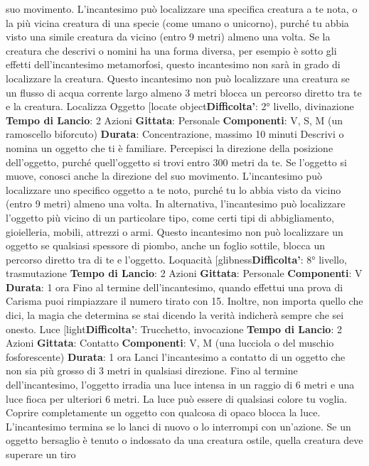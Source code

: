 \begin{multicols}{2}
suo movimento.
L’incantesimo può localizzare una specifica creatura a
te nota, o la più vicina creatura di una specie (come
umano o unicorno), purché tu abbia visto una simile
creatura da vicino (entro 9 metri) almeno una volta. Se
la creatura che descrivi o nomini ha una forma diversa,
per esempio è sotto gli effetti dell’incantesimo
metamorfosi, questo incantesimo non sarà in grado di
localizzare la creatura.
Questo incantesimo non può localizzare una creatura
se un flusso di acqua corrente largo almeno 3 metri
blocca un percorso diretto tra te e la creatura.
Localizza Oggetto
[locate object\textbf{Difficolta'}:
2° livello, divinazione
\textbf{Tempo di Lancio}: 2 Azioni
\textbf{Gittata}: Personale
\textbf{Componenti}: V, S, M (un ramoscello biforcuto)
\textbf{Durata}: Concentrazione, massimo 10 minuti
Descrivi o nomina un oggetto che ti è familiare.
Percepisci la direzione della posizione dell’oggetto,
purché quell’oggetto si trovi entro 300 metri da te. Se
l’oggetto si muove, conosci anche la direzione del suo
movimento.
L’incantesimo può localizzare uno specifico oggetto a te
noto, purché tu lo abbia visto da vicino (entro 9 metri)
almeno una volta. In alternativa, l’incantesimo può
localizzare l’oggetto più vicino di un particolare tipo,
come certi tipi di abbigliamento, gioielleria, mobili,
attrezzi o armi.
Questo incantesimo non può localizzare un oggetto se
qualsiasi spessore di piombo, anche un foglio sottile,
blocca un percorso diretto tra di te e l’oggetto.
Loquacità
[glibness\textbf{Difficolta'}:
8° livello, trasmutazione
\textbf{Tempo di Lancio}: 2 Azioni
\textbf{Gittata}: Personale
\textbf{Componenti}: V
\textbf{Durata}: 1 ora
Fino al termine dell’incantesimo, quando effettui una
prova di Carisma puoi rimpiazzare il numero tirato con
15. Inoltre, non importa quello che dici, la magia che
determina se stai dicendo la verità indicherà sempre
che sei onesto.
Luce
[light\textbf{Difficolta'}:
Trucchetto, invocazione
\textbf{Tempo di Lancio}: 2 Azioni
\textbf{Gittata}: Contatto
\textbf{Componenti}: V, M (una lucciola o del muschio
fosforescente)
\textbf{Durata}: 1 ora
Lanci l’incantesimo a contatto di un oggetto che non sia
più grosso di 3 metri in qualsiasi direzione. Fino al
termine dell’incantesimo, l’oggetto irradia una luce
intensa in un raggio di 6 metri e una luce fioca per
ulteriori 6 metri. La luce può essere di qualsiasi colore
tu voglia. Coprire completamente un oggetto con
qualcosa di opaco blocca la luce. L’incantesimo termina
se lo lanci di nuovo o lo interrompi con un’azione.
Se un oggetto bersaglio è tenuto o indossato da una
creatura ostile, quella creatura deve superare un tiro

\end{multicols}
